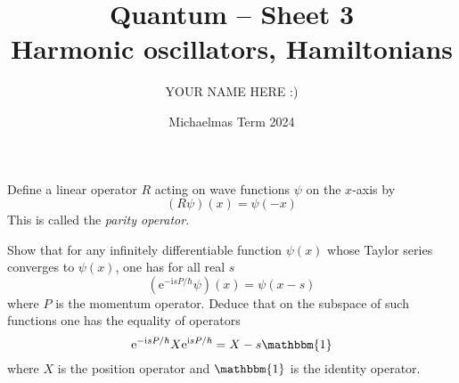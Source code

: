 \documentclass[answers]{exam}
\title{Quantum -- Sheet 3\\Harmonic oscillators, Hamiltonians}
\author{YOUR NAME HERE :)}
\date{Michaelmas Term 2024}
\begin{document}
\maketitle

\begin{questions}

\question%
Define a linear operator $R$ acting on wave functions $\psi$ on the $x$-axis by \[
	(R \psi)(x)=\psi(-x)
\] This is called the \emph{parity operator}.



\question%
Show that for any infinitely differentiable function $\psi(x)$ whose Taylor series converges to $\psi(x)$, one has for all real $s$ \[
	\left(\mathrm{e}^{-\mathrm{i} s P / \hbar} \psi\right)(x)=\psi(x-s)
\] where $P$ is the momentum operator. Deduce that on the subspace of such functions one has the equality of operators \[
	\mathrm{e}^{-\mathrm{i} s P / \hbar} X \mathrm{e}^{\mathrm{i} s P / \hbar}=X-s \mathbbm{1}
\] where $X$ is the position operator and $\mathbbm{1}$ is the identity operator.



\question%
\begin{parts}

\end{parts}
\end{questions}
\end{document}
